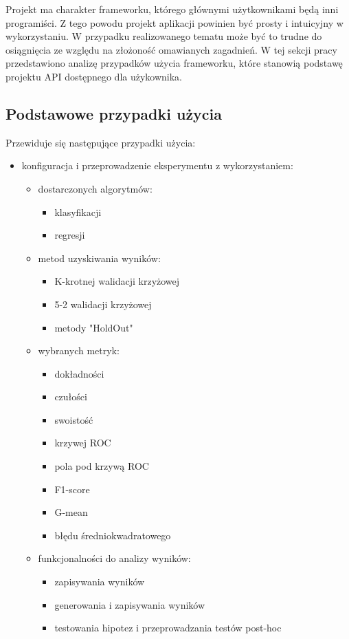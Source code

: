\documentclass[12pt]{article}
\begin{document}
Projekt ma charakter frameworku, którego głównymi użytkownikami będą inni programiści. Z tego powodu projekt aplikacji powinien być prosty i intuicyjny w wykorzystaniu. W przypadku realizowanego tematu może być to trudne do osiągnięcia ze względu na złożoność omawianych zagadnień. W tej sekcji pracy przedstawiono analizę przypadków użycia frameworku, które stanowią podstawę projektu API dostępnego dla użykownika.

\subsection{Podstawowe przypadki użycia}

Przewiduje się następujące przypadki użycia:

\begin{itemize}
	\item konfiguracja i przeprowadzenie eksperymentu z wykorzystaniem:
	\begin{itemize}
		\item dostarczonych algorytmów:
		\begin{itemize}
			\item klasyfikacji
			\item regresji		
		\end{itemize}
		\item metod uzyskiwania wyników:
		\begin{itemize}
			\item K-krotnej walidacji krzyżowej
			\item 5-2 walidacji krzyżowej
			\item metody "HoldOut"
		\end{itemize}
		\item wybranych metryk:
		\begin{itemize}
			\item dokładności
			\item czułości
			\item swoistość
			\item krzywej ROC
			\item pola pod krzywą ROC
			\item F1-score
			\item G-mean
			\item błędu średniokwadratowego
		\end{itemize}
		\item funkcjonalności do analizy wyników:
		\begin{itemize}
			\item zapisywania wyników
			\item generowania i zapisywania wyników
			\item testowania hipotez i przeprowadzania testów post-hoc
		\end{itemize}
	\end{itemize}
\end{itemize}
\end{document}
